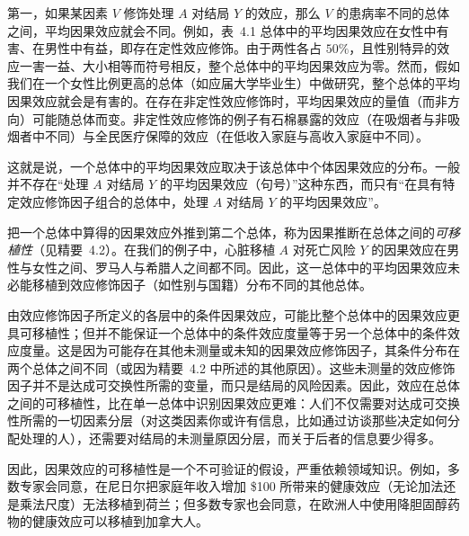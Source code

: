 第一，如果某因素 $V$ 修饰处理 $A$ 对结局 $Y$ 的效应，那么 $V$ 的患病率不同的总体之间，平均因果效应就会不同。例如，表~4.1 总体中的平均因果效应在女性中有害、在男性中有益，即存在定性效应修饰。由于两性各占 $50\%$，且性别特异的效应一害一益、大小相等而符号相反，整个总体中的平均因果效应为零。然而，假如我们在一个女性比例更高的总体（如应届大学毕业生）中做研究，整个总体的平均因果效应就会是有害的。在存在非定性效应修饰时，平均因果效应的量值（而非方向）可能随总体而变。非定性效应修饰的例子有石棉暴露的效应（在吸烟者与非吸烟者中不同）与全民医疗保障的效应（在低收入家庭与高收入家庭中不同）。

这就是说，一个总体中的平均因果效应取决于该总体中个体因果效应的分布。一般并不存在“处理 $A$ 对结局 $Y$ 的平均因果效应（句号）”这种东西，而只有“在具有特定效应修饰因子组合的总体中，处理 $A$ 对结局 $Y$ 的平均因果效应”。

把一个总体中算得的因果效应外推到第二个总体，称为因果推断在总体之间的\emph{可移植性}（见精要~4.2）。在我们的例子中，心脏移植 $A$ 对死亡风险 $Y$ 的因果效应在男性与女性之间、罗马人与希腊人之间都不同。因此，这一总体中的平均因果效应未必能移植到效应修饰因子（如性别与国籍）分布不同的其他总体。

由效应修饰因子所定义的各层中的条件因果效应，可能比整个总体中的因果效应更具可移植性；但并不能保证一个总体中的条件效应度量等于另一个总体中的条件效应度量。这是因为可能存在其他未测量或未知的因果效应修饰因子，其条件分布在两个总体之间不同（或因为精要~4.2 中所述的其他原因）。这些未测量的效应修饰因子并不是达成可交换性所需的变量，而只是结局的风险因素。因此，效应在总体之间的可移植性，比在单一总体中识别因果效应更难：人们不仅需要对达成可交换性所需的一切因素分层（对这类因素你或许有信息，比如通过访谈那些决定如何分配处理的人），还需要对结局的未测量原因分层，而关于后者的信息要少得多。

因此，因果效应的可移植性是一个不可验证的假设，严重依赖领域知识。例如，多数专家会同意，在尼日尔把家庭年收入增加 \$100 所带来的健康效应（无论加法还是乘法尺度）无法移植到荷兰；但多数专家也会同意，在欧洲人中使用降胆固醇药物的健康效应可以移植到加拿大人。

